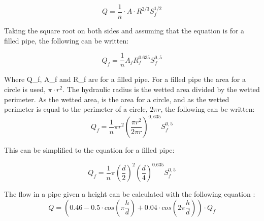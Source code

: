 \begin{equation}
	Q=\frac{1}{n} \cdot A\cdot R^{2/3} S_f^{1/2}			
\end{equation}

 Taking the square root on both sides and assuming that the equation is for a filled pipe, the following can be written:

\begin{equation}
  Q_{f} = \frac{1}{n} A_{f} R_{f}^{0.635}S_f^{0,5} 
\end{equation}


Where Q\_f, A\_f and R\_f are for a filled pipe. For a filled pipe the area for a circle is used, $\pi \cdot r^2$. The hydraulic radius is the wetted area divided by the wetted perimeter. As the wetted area, is the area for a circle, and as the wetted perimeter is equal to the perimeter of a circle, $2\pi r$, the following can be written: 
\begin{equation}
		Q_{f}= \frac{1}{n}\pi r^2\left(\frac{\pi r^2}{2\pi r}\right)^{0,635} S_f^{0,5} 
\end{equation}

This can be simplified to the equation for a filled pipe:

\begin{equation}%
	Q_{f} =\frac{1}{n}\pi\left(\frac{d}{2}\right)^2\left(\frac{d}{4}\right)^{0.635} S_f^{0,5}%
\end{equation}


The flow in a pipe given a height can be calculated with the following equation \cite{ikke_stationear}:
\begin{equation}%
 	Q = \left(0.46-0.5 \cdot cos\left(\pi \frac{h}{d}\right)+0.04\cdot cos\left(2\pi\frac{h}{d}\right)\right)\cdot Q_f
\end{equation}

